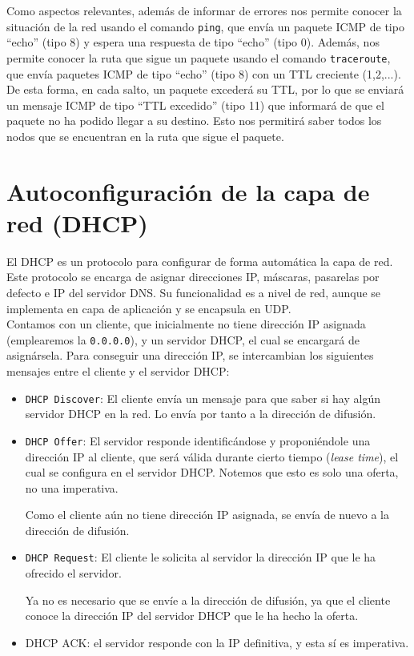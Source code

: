 Como aspectos relevantes, además de informar de errores nos permite conocer la situación de la red usando el comando \verb|ping|, que envía un paquete \acrshort{ICMP} de tipo ``echo'' (tipo 8) y espera una respuesta de tipo ``echo'' (tipo 0). Además, nos permite conocer la ruta que sigue un paquete usando el comando \verb|traceroute|, que envía paquetes \acrshort{ICMP} de tipo ``echo'' (tipo 8) con un \acrshort{TTL} creciente (1,2,...). De esta forma, en cada salto, un paquete excederá su \acrshort{TTL}, por lo que se enviará un mensaje \acrshort{ICMP} de tipo ``TTL excedido'' (tipo 11) que informará de que el paquete no ha podido llegar a su destino. Esto nos permitirá saber todos los nodos que se encuentran en la ruta que sigue el paquete.


\section{Autoconfiguración de la capa de red (\acrshort{DHCP})}

El \acrfull{DHCP} es un protocolo para configurar de forma automática la capa de red. Este protocolo se encarga de asignar direcciones IP, máscaras, pasarelas por defecto e IP del servidor \acrshort{DNS}. Su funcionalidad es a nivel de red, aunque se implementa en capa de aplicación y se encapsula en \acrshort{UDP}. \\

Contamos con un cliente, que inicialmente no tiene dirección IP asignada (emplearemos la \verb|0.0.0.0|), y un servidor \acrshort{DHCP}, el cual se encargará de asignársela. Para conseguir una dirección IP, se intercambian los siguientes mensajes entre el cliente y el servidor \acrshort{DHCP}:
\begin{itemize}
    \item \verb|DHCP Discover|: El cliente envía un mensaje para que saber si hay algún servidor \acrshort{DHCP} en la red. Lo envía por tanto a la dirección de difusión.
    \item \verb|DHCP Offer|: El servidor responde identificándose y proponiéndole una dirección IP al cliente, que será válida durante cierto tiempo (\textit{lease time}), el cual se configura en el servidor \acrshort{DHCP}. Notemos que esto es solo una oferta, no una imperativa.
    
    Como el cliente aún no tiene dirección IP asignada, se envía de nuevo a la dirección de difusión.
    \item \verb|DHCP Request|: El cliente le solicita al servidor la dirección IP que le ha ofrecido el servidor.
    
    Ya no es necesario que se envíe a la dirección de difusión, ya que el cliente conoce la dirección IP del servidor \acrshort{DHCP} que le ha hecho la oferta.
    \item DHCP ACK: el servidor responde con la IP definitiva, y esta sí es imperativa. 
\end{itemize}

